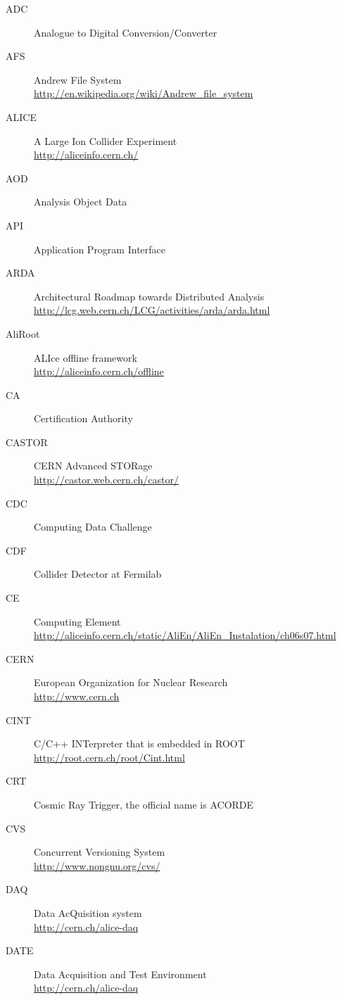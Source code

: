 \documentclass[12pt,a4paper,twoside]{article}
\begin{document}
{\begin{description}
\item[ADC]Analogue to Digital Conversion/Converter
\item[AFS]Andrew File System\\{\footnotesize \url{http://en.wikipedia.org/wiki/Andrew_file_system}}
\item[ALICE]A Large Ion Collider Experiment\\{\footnotesize \url{http://aliceinfo.cern.ch/}}
\item[AOD]Analysis Object Data
\item[API]Application Program Interface
\item[ARDA]Architectural Roadmap towards Distributed Analysis\\{\footnotesize \url{http://lcg.web.cern.ch/LCG/activities/arda/arda.html}}
\item[AliRoot]ALIce offline framework\\{\footnotesize \url{http://aliceinfo.cern.ch/offline}}
\item[CA]Certification Authority
\item[CASTOR]CERN Advanced STORage\\{\footnotesize \url{http://castor.web.cern.ch/castor/}}
\item[CDC]Computing Data Challenge
\item[CDF]Collider Detector at Fermilab
\item[CE]Computing Element\\{\footnotesize \url{http://aliceinfo.cern.ch/static/AliEn/AliEn_Instalation/ch06s07.html}}
\item[CERN]European Organization for Nuclear Research\\{\footnotesize \url{http://www.cern.ch}}
\item[CINT]C/C++ INTerpreter that is embedded in ROOT\\{\footnotesize \url{http://root.cern.ch/root/Cint.html}}
\item[CRT]Cosmic Ray Trigger, the official name is ACORDE\\{\footnotesize \url{}}
\item[CVS]Concurrent Versioning System\\{\footnotesize \url{http://www.nongnu.org/cvs/}}
\item[DAQ]Data AcQuisition system\\{\footnotesize \url{http://cern.ch/alice-daq}}
\item[DATE]Data Acquisition and Test Environment\\{\footnotesize \url{http://cern.ch/alice-daq}}

\end{description}}
\end{document}
